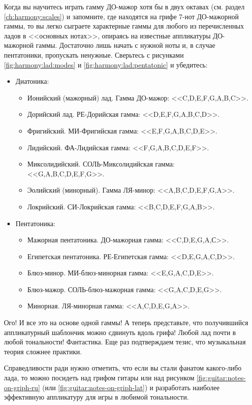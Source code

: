 Когда вы научитесь играть гамму ДО-мажор хотя бы в двух октавах (см. раздел \ref{ch:harmony:scales}) и запомните, где находятся на грифе 7-нот ДО-мажорной гаммы, то вы легко сыграете характерные гаммы для любого из перечисленных ладов в <<основных нотах>>, опираясь на известные аппликатуры ДО-мажорной гаммы. Достаточно лишь начать с нужной ноты и, в случае пентатоники, пропускать ненужные. Сверьтесь с рисунками \ref{fig:harmony:lad:modes} и \ref{fig:harmony:lad:pentatonic} и убедитесь:
\begin{itemize}
    \item Диатоника:
    \begin{itemize}
        \item Ионийский (мажорный) лад. Гамма ДО-мажор: <<C,D,E,F,G,A,B,C>>.
        \item Дорийский лад. РЕ-Дорийская гамма: <<D,E,F,G,A,B,C,D>>.
        \item Фригийский. МИ-Фригийская гамма: <<E,F,G,A,B,C,D,E>>.
        \item Лидийский. ФА-Лидийская гамма: <<F,G,A,B,C,D,E,F>>.
        \item Миксолидийский. СОЛЬ-Миксолидийская гамма: <<G,A,B,C,D,E,F,G>>.
        \item Эолийский (минорный). Гамма ЛЯ-минор: <<A,B,C,D,E,F,G,A>>.
        \item Локрийский. СИ-Локрийская гамма: <<B,C,D,E,F,G,A,B>>.
    \end{itemize}

    \item Пентатоника:
    \begin{itemize}
        \item Мажорная пентатоника. ДО-мажорная гамма: <<C,D,E,G,A,С>>.
        \item Египетская пентатоника. РЕ-Египетская гамма: <<D,E,G,A,C,D>>.
        \item Блюз-минор. МИ-блюз-минорная гамма: <<E,G,A,C,D,E>>.
        \item Блюз-мажор. СОЛЬ-блюз-мажорная гамма: <<G,A,C,D,E,G>>.
        \item Минорная. ЛЯ-минорная гамма: <<A,C,D,E,G,A>>.
    \end{itemize}
\end{itemize}

Ого! И все это на основе одной гаммы! А теперь представьте, что получившийся аппликатурный шаблончик можно сдвинуть вдоль грифа! Любой лад почти в любой тональности! Фантастика. Еще раз подтверждаем тезис, что музыкальная теория сложнее практики.

Справедливости ради нужно отметить, что если вы стали фанатом какого-либо лада, то можно посидеть над грифом гитары или над рисунком \ref{fig:guitar:notes-on-griph-ru} (или \ref{fig:guitar:notes-on-griph-lat}) и разработать наиболее эффективную аппликатуру для игры в любимой тональности.
